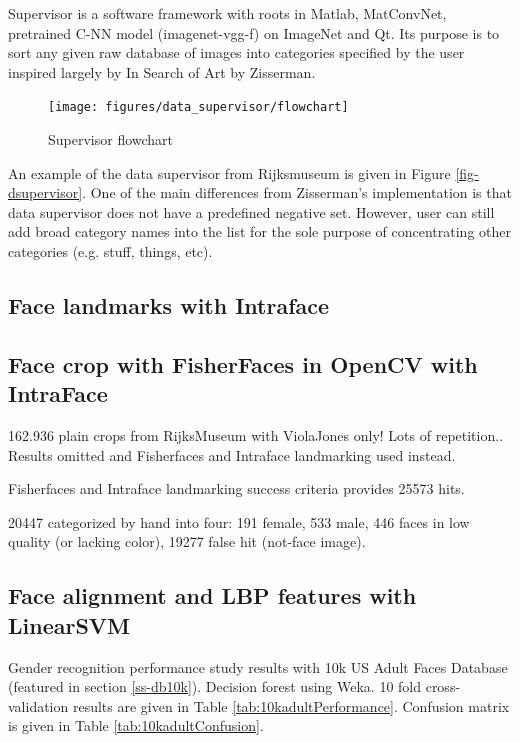 \documentclass[runningheads]{llncs}
\begin{document}
Supervisor is a software framework with roots in Matlab\cite{MATLAB:2014}, MatConvNet\cite{matconvnet}, pretrained C-NN model\cite{Chatfield14} (imagenet-vgg-f) on ImageNet\cite{ILSVRC15} and Qt. Its purpose is to sort any given raw database of images into categories specified by the user inspired largely by In Search of Art by Zisserman\cite{Crowley14a}.

\begin{figure}
	\texttt{[image: figures/data\_supervisor/flowchart]}
	\caption{Supervisor flowchart}
	\label{fig:supervisorflow}
\end{figure}

An example of the data supervisor from Rijksmuseum\cite{rijksmuseum1976tot} is given in Figure \ref{fig-dsupervisor}. One of the main differences from Zisserman's\cite{Crowley14a} implementation is that data supervisor does not have a predefined negative set. However, user can still add broad category names into the list for the sole purpose of concentrating other categories (e.g. stuff, things, etc).









\subsection{Face landmarks with Intraface}

\subsection{Face crop with FisherFaces in OpenCV with IntraFace}
162.936 plain crops from RijksMuseum\cite{rijksmuseum1976tot} with ViolaJones only! Lots of repetition.. Results omitted and Fisherfaces and Intraface landmarking used instead.

Fisherfaces and Intraface landmarking success criteria provides 25573 hits. 

20447 categorized by hand into four: 191 female, 533 male, 446 faces in low quality (or lacking color), 19277 false hit (not-face image).

\subsection{Face alignment and LBP features with LinearSVM}
Gender recognition performance study results with 10k US Adult Faces Database (featured in section \ref{ss-db10k}). Decision forest using Weka\cite{hall2009weka}. 10 fold cross-validation results are given in Table \ref{tab:10kadultPerformance}. Confusion matrix is given in Table \ref{tab:10kadultConfusion}.
\end{document}
